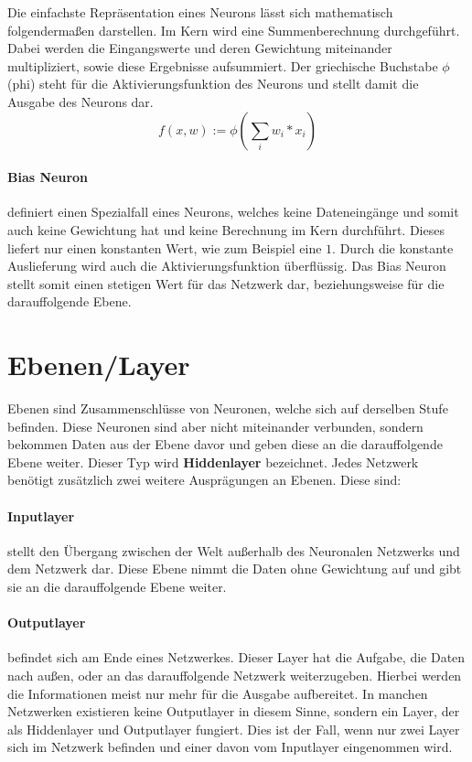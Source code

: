 \noindent 
Die einfachste Repräsentation eines Neurons lässt sich mathematisch folgendermaßen darstellen.
Im Kern wird eine Summenberechnung durchgeführt. 
Dabei werden die Eingangswerte und deren Gewichtung miteinander multipliziert, sowie diese Ergebnisse aufsummiert.
Der griechische Buchstabe $\phi$ (phi) steht für die Aktivierungsfunktion des Neurons und stellt damit die Ausgabe des Neurons dar.
\begin{equation}
	f(x, w) := \phi ( \sum\limits_{i}{w_i * x_i})
	\label{eq:Aktivierungsfunktion}
\end{equation}

\paragraph{Bias Neuron} 
\label{sec:Bias Neuron}
definiert einen Spezialfall eines Neurons, welches keine Dateneingänge und somit auch keine Gewichtung hat und keine Berechnung im Kern durchführt. 
Dieses liefert nur einen konstanten Wert, wie zum Beispiel eine $1$. 
Durch die konstante Auslieferung wird auch die Aktivierungsfunktion überflüssig. 
Das Bias Neuron stellt somit einen stetigen Wert für das Netzwerk dar, beziehungsweise für die darauffolgende Ebene.

\section{Ebenen/Layer}
\label{sec:Layer}

Ebenen sind Zusammenschlüsse von Neuronen, welche sich auf derselben Stufe befinden. 
Diese Neuronen sind aber nicht miteinander verbunden, sondern bekommen Daten aus der Ebene davor und geben diese an die darauffolgende Ebene weiter. 
Dieser Typ wird \textbf{Hiddenlayer} bezeichnet. 
Jedes Netzwerk benötigt zusätzlich zwei weitere Ausprägungen an Ebenen. 
Diese sind:

\paragraph{Inputlayer} stellt den Übergang zwischen der Welt außerhalb des Neuronalen Netzwerks und dem Netzwerk dar.
Diese Ebene nimmt die Daten ohne Gewichtung auf und gibt sie an die darauffolgende Ebene weiter. 

\paragraph{Outputlayer} befindet sich am Ende eines Netzwerkes. 
Dieser Layer hat die Aufgabe, die Daten nach außen, oder an das darauffolgende Netzwerk weiterzugeben. 
Hierbei werden die Informationen meist nur mehr für die Ausgabe aufbereitet. 
In manchen Netzwerken existieren keine Outputlayer in diesem Sinne, sondern ein Layer, der als Hiddenlayer und Outputlayer fungiert. 
Dies ist der Fall, wenn nur zwei Layer sich im Netzwerk befinden und einer davon vom Inputlayer eingenommen wird.
\\

